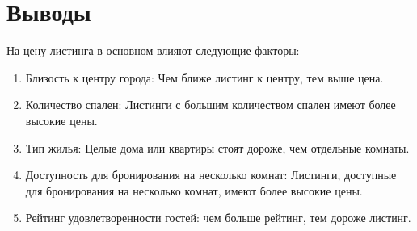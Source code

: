 \documentclass[
	11pt
] {article}
\begin{document}
\section{Выводы}
	На цену листинга в основном влияют следующие факторы:
	\begin{enumerate}
		\item Близость к центру города: Чем ближе листинг к центру, тем выше цена.

		\item Количество спален: Листинги с большим количеством спален имеют более высокие цены.

		\item Тип жилья: Целые дома или квартиры стоят дороже, чем отдельные комнаты.

		\item Доступность для бронирования на несколько комнат: Листинги, доступные для бронирования на несколько комнат, имеют более высокие цены.

		\item Рейтинг удовлетворенности гостей: чем больше рейтинг, тем дороже листинг.
	\end{enumerate}




\end{document}
